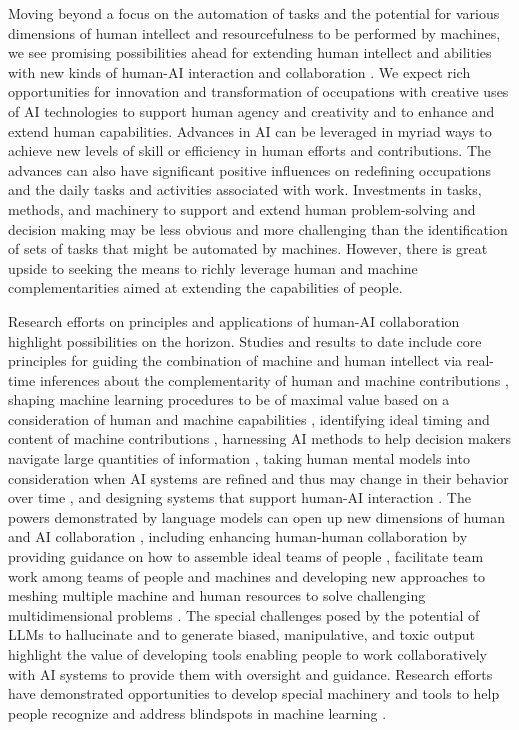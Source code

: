 Moving beyond a focus on the automation of tasks and the potential for various dimensions of human intellect and resourcefulness to be performed by machines, we see promising possibilities ahead for extending human intellect and abilities with new kinds of human-AI interaction and collaboration \cite{tannerlecture2022}. We expect rich opportunities for innovation and transformation of occupations with creative uses of AI technologies to support human agency and creativity and to enhance and extend human capabilities. Advances in AI can be leveraged in myriad ways to achieve new levels of skill or efficiency in human efforts and contributions. The advances can also have significant positive influences on redefining occupations and the daily tasks and activities associated with work. Investments in tasks, methods, and machinery to support and extend human problem-solving and decision making may be less obvious and more challenging than the identification of sets of tasks that might be automated by machines.  However, there is great upside to seeking the means to richly leverage human and machine complementarities aimed at extending the capabilities of people.

Research efforts on principles and applications of human-AI collaboration highlight possibilities on the horizon. Studies and results to date include core principles for guiding the combination of machine and human intellect via real-time inferences about the complementarity of human and machine contributions \cite{mixedinit1999, complementary2007, kamar2012, ramakrishnan2019}, shaping machine learning procedures to be of maximal value based on a consideration of human and machine capabilities \cite{wilder2020, bansal2021}, identifying ideal timing and content of machine contributions \cite{mozannar2022Copilot}, harnessing AI methods to help decision makers navigate large quantities of information \cite{aidisplay1995},  taking human mental models into consideration when AI systems are refined and thus may change in their behavior over time \cite{bansal2019}, and designing systems that support human-AI interaction \cite{amershi2019}. The powers demonstrated by language models can open up new dimensions of human and AI collaboration \cite{mixedinitfutures2007}, including enhancing human-human collaboration by providing guidance on how to assemble ideal teams of people \cite{singla2015}, facilitate team work among teams of people and machines \cite{bohus2009} and developing new approaches to meshing multiple machine and human resources to solve challenging multidimensional problems \cite{Shahaf2010}. The special challenges posed by the potential of LLMs to hallucinate and to generate biased, manipulative, and toxic output highlight the value of developing tools enabling people to work collaboratively with AI systems to provide them with oversight and guidance. Research efforts have demonstrated opportunities to develop special machinery and tools to help people recognize and address blindspots in machine learning \cite{Lakkaraju2017}. 


